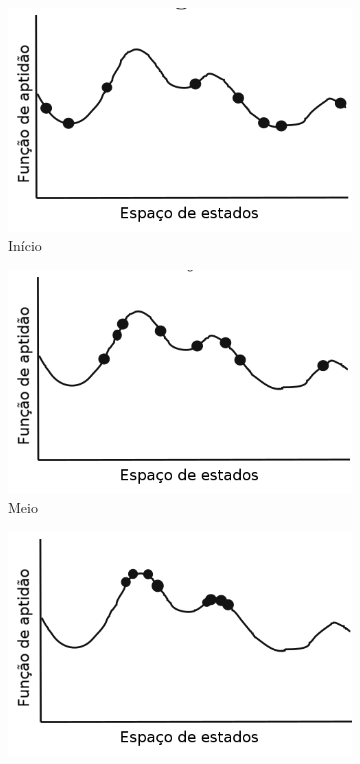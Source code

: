 \begin{figure}[htb!]
\centering
	\begin{subfigure}[b]{0.3\textwidth}
		\includegraphics[width=\textwidth]{fig/evolutionary-algorithms-function-start.png}
		\caption{Início}
		\label{fig:evolutionary-algorithms-function-start}
	\end{subfigure}
	\begin{subfigure}[b]{0.3\textwidth}
		\includegraphics[width=\textwidth]{fig/evolutionary-algorithms-function-middle.png}
		\caption{Meio}
		\label{fig:evolutionary-algorithms-function-middle}
	\end{subfigure}
	\begin{subfigure}[b]{0.3\textwidth}
		\includegraphics[width=\textwidth]{fig/evolutionary-algorithms-function-end.png}

\end{subfigure}
\end{figure}
